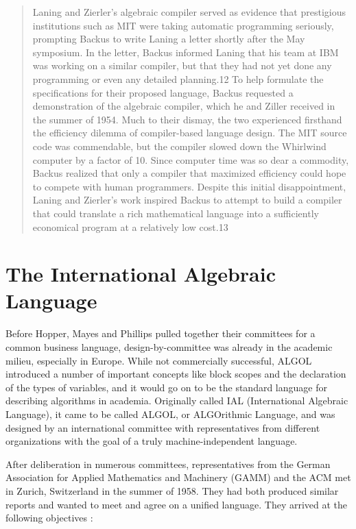 \begin{quotation}
Laning and Zierler's algebraic compiler served as evidence that prestigious
institutions such as MIT were taking automatic programming
seriously, prompting
Backus to write Laning a letter shortly after the May symposium.
In the letter,
Backus informed Laning that his team at IBM was working on a
similar compiler,
but that they had not yet done any programming or even any
detailed planning.12
To help formulate the specifications for their proposed language, Backus
requested a demonstration of the algebraic compiler, which he and Ziller
received in the summer of 1954. Much to their dismay, the two
experienced firsthand the efficiency dilemma of compiler-based
language design. The MIT
source code was commendable, but the compiler slowed down the Whirlwind
computer by a factor of 10. Since computer time was so dear a
commodity, Backus
realized that only a compiler that maximized efficiency could
hope to compete
with human programmers. Despite this initial disappointment, Laning and
Zierler's work inspired Backus to attempt to build a compiler that could
translate a rich mathematical language into a sufficiently
economical program
at a relatively low cost.13
\cite{grace_hopper_and_the_invention_of_the_information_age_2009}
\end{quotation}

\section{The International Algebraic Language}

Before Hopper, Mayes and Phillips pulled together their committees for a common
business language, design-by-committee was already in the academic milieu,
especially in Europe.
While not commercially successful, ALGOL introduced a number of important concepts
like block scopes and the declaration of the types of variables, and it would
go on to be the standard language for describing algorithms in academia.
Originally called IAL (International Algebraic Language), it came to be called
ALGOL, or ALGOrithmic Language, and was designed by an international committee
with representatives from different organizations with the goal of a truly
machine-independent language.

After deliberation in numerous committees, representatives from the German
Association for Applied Mathematics and Machinery (GAMM) and the ACM met in
Zurich, Switzerland in the summer of 1958. They had both produced similar
reports and wanted to meet and agree on a unified language.
They arrived at the following objectives
\cite{perlis_samelson_1958_preliminary_report_ial}:

